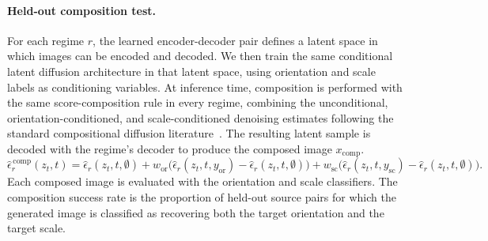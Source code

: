 

\paragraph{Held-out composition test.}
For each regime $r$, the learned encoder-decoder pair defines a latent space in which images can be
encoded and decoded. We then train the same conditional latent diffusion architecture in that latent
space, using orientation and scale labels as conditioning variables. At inference time, composition
is performed with the same score-composition rule in every regime, combining the unconditional,
orientation-conditioned, and scale-conditioned denoising estimates following the standard
compositional diffusion literature~\citep{liu2022compositional, du2024compositional}. The resulting
latent sample is decoded with the regime's decoder to produce the composed image $x_{\mathrm{comp}}$.
\begin{equation}
\hat{\epsilon}^{\,\mathrm{comp}}_r(z_t,t)
=
\hat{\epsilon}_r(z_t,t,\emptyset)
+
w_{\mathrm{or}}\bigl(\hat{\epsilon}_r(z_t,t,y_{\mathrm{or}})-\hat{\epsilon}_r(z_t,t,\emptyset)\bigr)
+
w_{\mathrm{sc}}\bigl(\hat{\epsilon}_r(z_t,t,y_{\mathrm{sc}})-\hat{\epsilon}_r(z_t,t,\emptyset)\bigr).
\end{equation}
Each composed image is evaluated with the orientation and scale classifiers. The composition success
rate is the proportion of held-out source pairs for which the generated image is classified as
recovering both the target orientation and the target scale.

